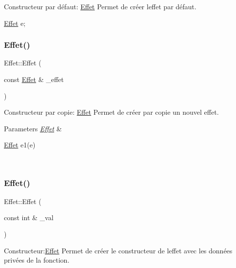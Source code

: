 Constructeur par défaut\+: \hyperlink{classEffet}{Effet} Permet de créer l\textquotesingle{}effet par défaut. 


\begin{DoxyCode}
\hyperlink{classEffet}{Effet} e;
\end{DoxyCode}
 \mbox{\label{classEffet_a48bc981d19131a8b0b562874d21b014d}} 
\subsubsection{\texorpdfstring{Effet()}{Effet()}\hspace{0.1cm}{\footnotesize\ttfamily [2/3]}}
{\footnotesize\ttfamily Effet\+::\+Effet (\begin{DoxyParamCaption}\item[{const \hyperlink{classEffet}{Effet} \&}]{\+\_\+effet }\end{DoxyParamCaption})}



Constructeur par copie\+: \hyperlink{classEffet}{Effet} Permet de créer par copie un nouvel effet. 


\begin{DoxyParams}{Parameters}
{\em \hyperlink{classEffet}{Effet}} & 
\begin{DoxyCode}
\hyperlink{classEffet}{Effet} e1(e)
\end{DoxyCode}
 \\
\hline
\end{DoxyParams}
\mbox{\label{classEffet_a29d6d24eaf9a773e74732919c5a4003a}} 
\subsubsection{\texorpdfstring{Effet()}{Effet()}\hspace{0.1cm}{\footnotesize\ttfamily [3/3]}}
{\footnotesize\ttfamily Effet\+::\+Effet (\begin{DoxyParamCaption}\item[{const int \&}]{\+\_\+val }\end{DoxyParamCaption})}



Constructeur\+:\hyperlink{classEffet}{Effet} Permet de créer le constructeur de l\textquotesingle{}effet avec les données privées de la fonction. 


